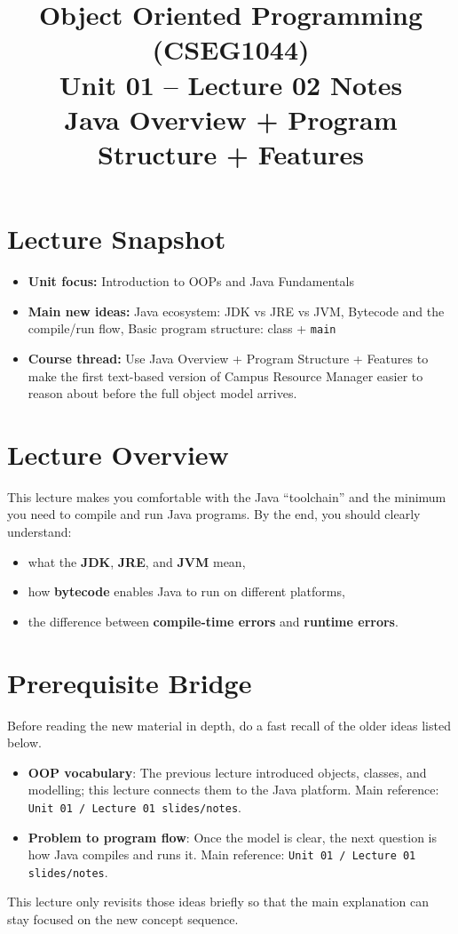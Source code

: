 \documentclass[11pt]{article}
\title{Object Oriented Programming (CSEG1044)\\Unit 01 -- Lecture 02 Notes\\Java Overview + Program Structure + Features}
\begin{document}
\maketitle
\tableofcontents

\section{Lecture Snapshot}
\begin{itemize}
  \item \textbf{Unit focus:} Introduction to OOPs and Java Fundamentals
  \item \textbf{Main new ideas:} Java ecosystem: JDK vs JRE vs JVM, Bytecode and the compile/run flow, Basic program structure: class + \texttt{main}
  \item \textbf{Course thread:} Use Java Overview + Program Structure + Features to make the first text-based version of Campus Resource Manager easier to reason about before the full object model arrives.
\end{itemize}
\notesources{\OOPSUnitISources}

\section{Lecture Overview}
This lecture makes you comfortable with the Java ``toolchain'' and the minimum you need to compile and run Java programs.
By the end, you should clearly understand:
\begin{itemize}
  \item what the \textbf{JDK}, \textbf{JRE}, and \textbf{JVM} mean,
  \item how \textbf{bytecode} enables Java to run on different platforms,
  \item the difference between \textbf{compile-time errors} and \textbf{runtime errors}.
\end{itemize}
\notesources{\OOPSUnitISources}

\section{Prerequisite Bridge}
Before reading the new material in depth, do a fast recall of the older ideas listed below.
\begin{itemize}
  \item \textbf{OOP vocabulary}: The previous lecture introduced objects, classes, and modelling; this lecture connects them to the Java platform. Main reference: \texttt{Unit 01 / Lecture 01 slides/notes}.
  \item \textbf{Problem to program flow}: Once the model is clear, the next question is how Java compiles and runs it. Main reference: \texttt{Unit 01 / Lecture 01 slides/notes}.
\end{itemize}
This lecture only revisits those ideas briefly so that the main explanation can stay focused on the new concept sequence.
\notesources{\OOPSUnitISources}
\end{document}
